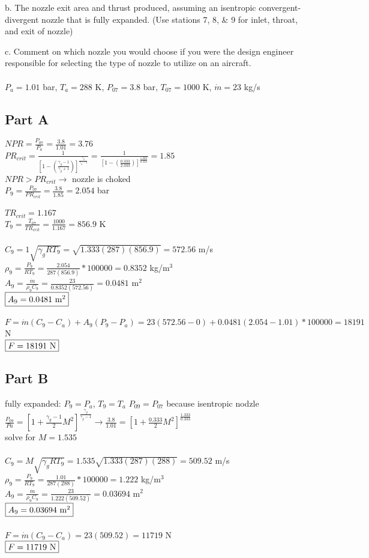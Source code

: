 \documentclass{article}
\begin{document}
b. The nozzle exit area and thrust produced, assuming an isentropic convergent-
divergent nozzle that is fully expanded. (Use stations 7, 8, \& 9 for inlet, throat, and
exit of nozzle)

c. Comment on which nozzle you would choose if you were the design engineer
responsible for selecting the type of nozzle to utilize on an aircraft. \\\\
$P_a=1.01$ bar, $T_a=288$ K, $P_{07}=3.8$ bar, $T_{07}=1000$ K, $\dot{m}=23$ kg/s

\subsection*{Part A}
$NPR=\frac{P_{07}}{P_a}=\frac{3.8}{1.01}=3.76$ \\
$PR_{crit}=\frac{1}{[1-(\frac{\gamma_g-1}{\gamma_g+1})]
^\frac{\gamma_g}{\gamma_g-1}}=\frac{1}{[1-(\frac{0.333}{2.333})]
^\frac{1.333}{0.333}}=1.85$ \\
$NPR>PR_{crit} \rightarrow$ nozzle is choked \\
$P_9=\frac{P_{07}}{PR_{crit}}=\frac{3.8}{1.85}=2.054$ bar \\\\
$TR_{crit}=1.167$ \\
$T_9=\frac{T_{07}}{TR_{crit}}=\frac{1000}{1.167}=856.9$ K \\\\
$C_9=1\sqrt{\gamma_gRT_9}=\sqrt{1.333(287)(856.9)}=572.56$ m/s \\
$\rho_9=\frac{P_9}{RT_9}=\frac{2.054}{287(856.9)}*100000=0.8352$ kg/m$^3$ \\
$A_9=\frac{\dot{m}}{\rho_9C_9}=\frac{23}{0.8352(572.56)}=0.0481$ m$^2$ \\
$\fbox{$A_9=0.0481$ m$^2$}$ \\\\
$F=\dot{m}(C_9-C_a)+A_9(P_9-P_a)=23(572.56-0)+0.0481(2.054-1.01)*100000=18191$ N \\
$\fbox{$F=18191$ N}$

\subsection*{Part B}
fully expanded: $P_9=P_a$, $T_9=T_a$
$P_{09}=P_{07}$ because isentropic nodzle \\
$\frac{P_{09}}{Pa}=[1+\frac{\gamma_g-1}{2}M^2]^\frac{\gamma_g}{\gamma_g-1} \rightarrow
\frac{3.8}{1.01}=[1+\frac{0.333}{2}M^2]^\frac{1.333}{0.333}$ \\
solve for $M=1.535$ \\\\
$C_9=M\sqrt{\gamma_gRT_9}=1.535\sqrt{1.333(287)(288)}=509.52$ m/s \\
$\rho_9=\frac{P_9}{RT_9}=\frac{1.01}{287(288)}*100000=1.222$ kg/m$^3$ \\
$A_9=\frac{\dot{m}}{\rho_9C_9}=\frac{23}{1.222(509.52)}=0.03694$ m$^2$ \\
$\fbox{$A_9=0.03694$ m$^2$}$ \\\\
$F=\dot{m}(C_9-C_a)=23(509.52)=11719$ N \\
$\fbox{$F=11719$ N}$
\end{document}
